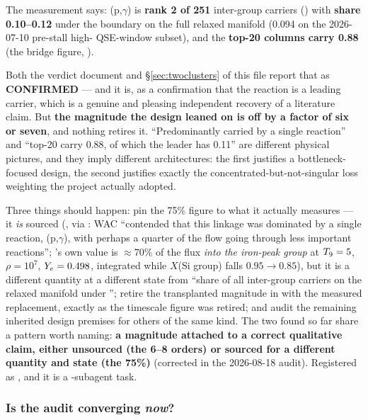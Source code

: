 The measurement  says: (p,$\gamma$)
is \textbf{rank 2 of 251} inter-group carriers () with \textbf{share
0.10--0.12} under the  boundary on the full relaxed manifold
(0.094 on the 2026-07-10 pre-stall high-\Ye{} QSE-window subset), and the
\textbf{top-20 columns carry 0.88} (the  bridge figure,
).

Both the verdict document and \S\ref{sec:twoclusters} of this file report that
as \textbf{CONFIRMED} --- and it is, as a confirmation that the reaction is a
leading carrier, which is a genuine and pleasing independent recovery of a
literature claim. But \textbf{the magnitude the design leaned on is off by a
factor of six or seven}, and nothing retires it. ``Predominantly carried by a
single reaction'' and ``top-20 carry 0.88, of which the leader has 0.11'' are
different physical pictures, and they imply different architectures: the first
justifies a bottleneck-focused design, the second justifies exactly the
concentrated-but-not-singular loss weighting the project actually adopted.

Three things should happen: pin the 75\% figure to what it actually measures ---
it \emph{is} sourced (\citealt{woosley1973}, via \citealt{hix1996}: WAC
``contended that this linkage was dominated by a single reaction,
(p,$\gamma$), with perhaps a quarter of the flow going
through less important reactions''; \citeauthor{hix1996}'s own value is
$\approx$70\% of the flux \emph{into the iron-peak group} at $T_{9} = 5$,
$\rho = 10^{7}$, $Y_{e} = 0.498$, integrated while $X$(Si group) falls
$0.95 \to 0.85$), but it is a different quantity at a different state from
``share of all inter-group carriers on the relaxed manifold under
''; retire the transplanted magnitude in  with
the measured replacement, exactly as the timescale figure was retired; and
audit the remaining inherited design premises for others of the same kind. The
two found so far share a pattern worth naming: \textbf{a magnitude attached to a
correct qualitative claim, either unsourced (the 6--8 orders) or sourced for a
different quantity and state (the 75\%)} (corrected in the 2026-08-18 audit).
Registered as , and it is a -subagent task.

\subsubsection{Is the audit converging \emph{now}?}
\label{sec:convergingnow}


